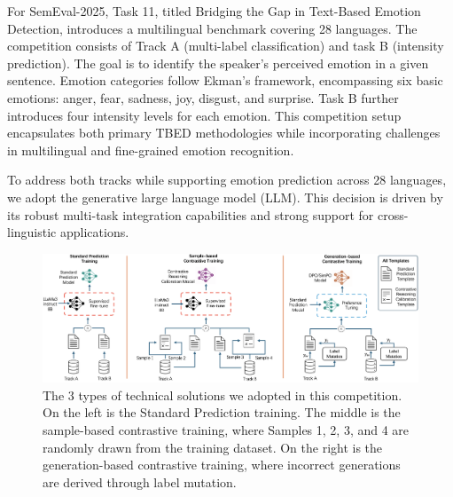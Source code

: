 \documentclass[11pt]{article}
\begin{document}

For SemEval-2025, Task 11, titled Bridging the Gap in Text-Based Emotion Detection, introduces a multilingual benchmark covering 28 languages\cite{muhammad2025brighterbridginggaphumanannotated,belay-etal-2025-evaluating}. The competition consists of Track A (multi-label classification) and task B (intensity prediction). The goal is to identify the speaker's perceived emotion in a given sentence. Emotion categories follow Ekman's framework\cite{ekman1969repertoire}, encompassing six basic emotions: anger, fear, sadness, joy, disgust, and surprise. Task B further introduces four intensity levels for each emotion. This competition setup encapsulates both primary TBED methodologies while incorporating challenges in multilingual and fine-grained emotion recognition. 


To address both tracks while supporting emotion prediction across 28 languages, we adopt the generative large language model (LLM). This decision is driven by its robust multi-task integration capabilities and strong support for cross-linguistic applications.

\begin{figure}[h]
  \centering
  \includegraphics[width=430pt]{Overall}
  \vspace{-5pt}
  \caption{The 3 types of technical solutions we adopted in this competition. On the left is the Standard Prediction training. The middle is the sample-based contrastive training, where Samples 1, 2, 3, and 4 are randomly drawn from the training dataset. On the right is the generation-based contrastive training, where incorrect generations are derived through label mutation.}
  \label{fig:Overall}
 \vspace{-15pt}
\end{figure}
\end{document}
